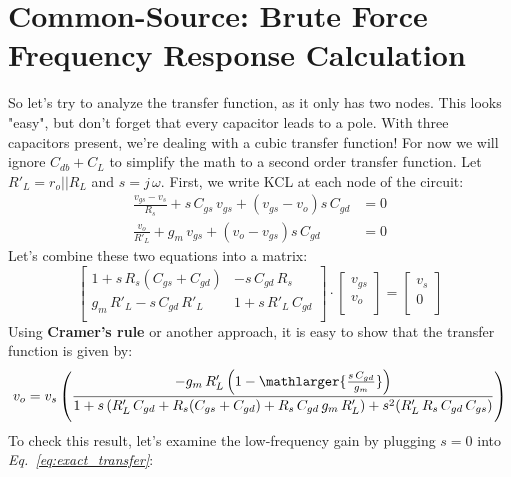 \section{Common-Source:  Brute Force Frequency Response Calculation}
So let's try to analyze the transfer function, as it only has two nodes.  This looks "easy", but don't forget that every capacitor leads to a pole.  With three capacitors present, we're dealing with a cubic transfer function! For now we will ignore $C_{db}+C_L$ to simplify the math to a second order transfer function.  Let $R'_L = r_o || R_L$ and $s = j\,\omega$.  First, we write KCL at each node of the circuit:
    \begin{align}
        \frac{v_{gs} - v_s}{R_s} + s\,C_{gs}\,v_{gs} + (v_{gs} - v_o)s\,C_{gd} &= 0\\[0.25cm]
        \frac{v_o}{R'_L} + g_m\,v_{gs} + (v_o - v_{gs}) s\,C_{gd} &= 0 
    \end{align}
Let's combine these two equations into a matrix:
    \begin{equation}
        \left[\begin{matrix}
            1 + s\,R_s (C_{gs} + C_{gd}) & -s\,C_{gd}\,R_s\\[0.35cm]
            g_m\,R'_L - s\,C_{gd}\,R'_L & 1 + s\,R'_L\,C_{gd}\\
        \end{matrix}\right]
        \cdot
        \left[\begin{matrix}
            v_{gs}\\[0.35cm]
            v_o\\
        \end{matrix}\right] 	
        =
        \left[\begin{matrix}
            v_s\\[0.35cm]
            0\\
        \end{matrix}\right] 
    \end{equation}
Using \textbf{Cramer's rule} or another approach, it is easy to show that the transfer function is given by:
    \begin{equation}
        v_o = v_s\left(\frac{-g_m\,R'_L\left(1 - \mathlarger{\frac{s\,C_{gd}}{g_m}}\right)}
                    {1 + s\left(R'_L\,C_{gd} + R_s(C_{gs} + C_{gd}) + R_s\,C_{gd}\,g_m\,R'_L \right) 
                        + s^2(R'_L\,R_s\,C_{gd}\,C_{gs})}\right)
        \label{eq:exact_transfer}
    \end{equation}
To check this result, let's examine the low-frequency gain by plugging $s = 0$ into \emph{Eq.~\ref{eq:exact_transfer}}:
